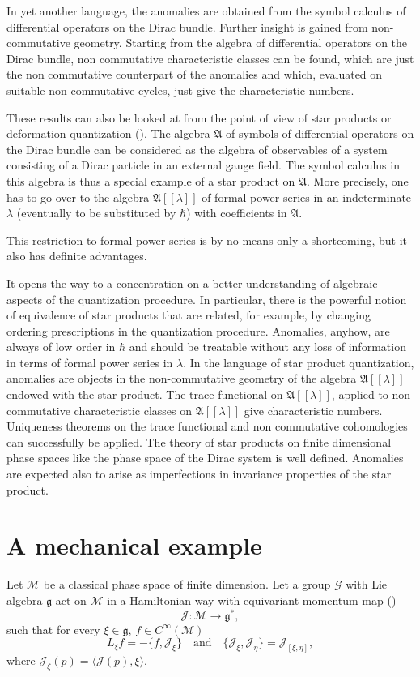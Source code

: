 \documentclass[a4paper,12pt]{article}
\begin{document}
In yet another language, the anomalies are obtained from the symbol calculus of
differential operators on the Dirac bundle. Further insight is gained from
non-commutative geometry. Starting from the algebra of differential operators on
the Dirac bundle, non commutative characteristic classes can be found, which are 
just the non commutative counterpart of the anomalies and which, evaluated on
suitable non-commutative cycles, just give the characteristic numbers.

These results can also be looked at from the point of view of star products or
deformation quantization (\cite{BFFLS77,BFFLS78,BCG97}). 
The algebra $\mathfrak{A}$ of symbols of differential
operators on the Dirac bundle can be considered as the algebra of observables of 
a system consisting of a Dirac particle in an external gauge field. The symbol
calculus in this algebra is thus a special example of a star product on
$\mathfrak A$. More precisely, one has to go over to the algebra
$\mathfrak A[[\lambda]]$ of formal power series in an
indeterminate $\lambda$ (eventually to be substituted by $\hbar$) with
coefficients in $\mathfrak A$.

This restriction to formal power series is by no means only a shortcoming, but
it also has definite advantages.

It opens the way to a concentration on a better understanding of algebraic
aspects of the quantization procedure. In particular, there is the powerful notion
of equivalence of star products that are related, for example, by changing ordering
prescriptions in the quantization procedure. Anomalies, anyhow, are always of
low order in $\hbar$ and should be treatable without any loss of information in
terms of formal power series in $\lambda$. In the language of star product
quantization, anomalies are objects in the non-commutative geometry of the
algebra $\mathfrak A[[\lambda]]$ endowed with the star product. The trace functional
on $\mathfrak A[[\lambda]]$, applied to non-commutative characteristic classes on
$\mathfrak A[[\lambda]]$  give characteristic numbers. Uniqueness theorems on the
trace functional and non commutative cohomologies can successfully be applied. The
theory of star products on finite dimensional phase spaces like the phase space 
of the Dirac system is well defined. Anomalies are expected also to arise as
imperfections in invariance properties of the star product.

\section{A mechanical example}
Let $\mathcal M$ be a classical phase space of finite dimension. Let a group
$\mathcal G$ with Lie algebra $\mathfrak g$ act on $\mathcal M$ in a Hamiltonian 
way with equivariant momentum map (\cite{AM85})
\[
\mathcal J:\mathcal M\rightarrow\mathfrak g^\ast,
\]
such that for every $\xi\in \mathfrak g$, $f\in C^\infty(\mathcal M)$
\[
L_\xi f=-\{f,\mathcal J_\xi\} \quad \textrm{and} \quad 
\{\mathcal J_\xi,\mathcal J_\eta\}=\mathcal J_{[\xi,\eta]},
\]
where ${\mathcal J}_\xi(p)=\langle {\mathcal J}(p),\xi\rangle$.
\end{document}
